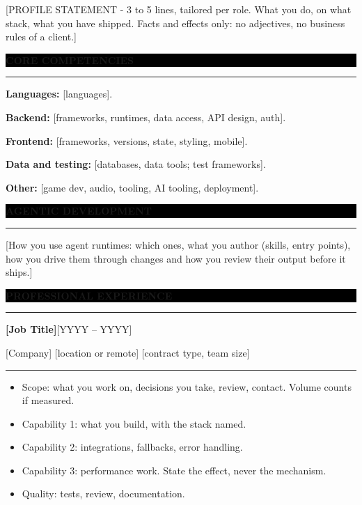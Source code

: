 \documentclass[10pt]{article}
\newcommand{\sectionbar}[1]{%
  \needspace{4\baselineskip}%
  \par\vspace{7pt}%
  \noindent\colorbox{black}{\parbox{\dimexpr\linewidth-2\fboxsep}{\color{white}\bfseries\footnotesize\MakeUppercase{#1}}}%
  \par\vspace{2pt}%
  \noindent\rule{\linewidth}{0.8pt}%
  \par\vspace{2pt}%
}
\newcommand{\entry}[3]{%
  \par\vspace{2pt}%
  {\bfseries #1}\hfill{\footnotesize #2}\par
  {\footnotesize #3}\par\vspace{1pt}%
  \noindent\rule{\linewidth}{0.3pt}\par\vspace{2pt}%
}
\begin{document}
\noindent{}

\vspace{4pt}
{\footnotesize
[PROFILE STATEMENT - 3 to 5 lines, tailored per role. What you do, on what stack, what you have
shipped. Facts and effects only: no adjectives, no business rules of a client.]}

\sectionbar{Core competencies}

{\footnotesize
\textbf{Languages:} [languages].\par
\textbf{Backend:} [frameworks, runtimes, data access, API design, auth].\par
\textbf{Frontend:} [frameworks, versions, state, styling, mobile].\par
\textbf{Data and testing:} [databases, data tools; test frameworks].\par
\textbf{Other:} [game dev, audio, tooling, AI tooling, deployment].}

\sectionbar{Agentic development}

{\footnotesize [How you use agent runtimes: which ones, what you author (skills, entry points),
how you drive them through changes and how you review their output before it ships.]}

\sectionbar{Professional experience}

\entry{[Job Title]}{[YYYY -- YYYY]}{[Company] \textbar{} [location or remote] \textbar{} [contract type, team size]}

{\footnotesize
\begin{itemize}
  \item {Scope: what you work on, decisions you take, review, contact. Volume counts if measured.}
  \item {Capability 1: what you build, with the stack named.}
  \item {Capability 2: integrations, fallbacks, error handling.}
  \item {Capability 3: performance work. State the effect, never the mechanism.}
  \item {Quality: tests, review, documentation.}
\end{itemize}}
\end{document}
